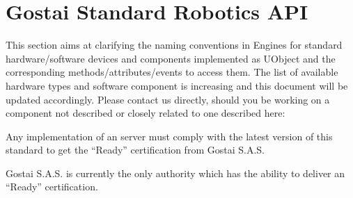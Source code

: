 
\newcommand{\refInterface}[2][\empty]%
  {\refObject[#1]{Interface.#2}}

\newcommand{\interface}[1]{%
  \subsection[#1]{\labelObject{Interface.#1}\lstindex{#1}}%
  \def\currentObject{Interface.#1}%
}

\newcommand{\subinterface}[2]{%
  \subsubsection[#2]{\labelObject{Interface.#2}\lstindex{#2}}%
  \def\currentObject{Interface.#2}%
  Subclass of \refInterface{#1}.%
}

\newcommand{\gsrapi}{Gostai Standard Robotics API\xspace}

\chapter{Gostai Standard Robotics API}
\label{sec:naming}


This section aims at clarifying the naming conventions in \urbi Engines for
standard hardware/software devices and components implemented as UObject and
the corresponding methods/attributes/events to access them. The list of
available hardware types and software component is increasing and this
document will be updated accordingly. Please contact us directly, should you
be working on a component not described or closely related to one described
here:

\begin{center}
\end{center}

Any implementation of an \urbi server must comply with the latest version of
this standard to get the ``\urbi Ready'' certification from Gostai S.A.S.

Gostai S.A.S. is currently the only authority which has the ability to
deliver an ``\urbi Ready'' certification.


